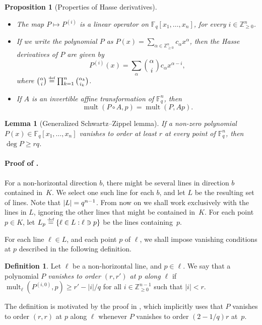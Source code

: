 \documentclass{daj}
\newtheorem{lemma}[theorem]{Lemma}
\newtheorem{proposition}[theorem]{Proposition}
\theoremstyle{definition}
\newtheorem{definition}[theorem]{Definition}
\newcommand*{\eqdef}{\stackrel{\mbox{\normalfont\tiny def}}{=}}   %
\newcommand*{\Znneg}{\mathbb{Z}_{\geq 0}}                          %
\newcommand*{\Fq}{\mathbb{F}_q}                                  %
\DeclarePairedDelimiter\abs{\lvert}{\rvert}                     %
\DeclareMathOperator{\mult}{mult}                              %
\begin{document}
\begin{proposition}[Properties of Hasse derivatives]\label{prop:hasse}\
\begin{itemize}
\item The map $P\mapsto P^{(i)}$ is a linear operator on $\Fq [x_1,\dotsc,x_n]$, for every $i\in \Znneg^{n}$.
\item If we write the polynomial $P$ as $P(x)=\sum_{\alpha\in\mathbb{Z}_{\geq 0}^n}c_\alpha x^\alpha$, then the Hasse derivatives of $P$ are given by
\[P^{(i)}(x)=\sum_{\alpha}\binom{\alpha}{i}c_{\alpha} x^{\alpha-i},\]
where $\binom{\alpha}{i}\eqdef\prod_{k=1}^n\binom{\alpha_k}{i_k}$.
\item If $A$ is an invertible affine transformation of $\Fq^n$, then 
\[\mult(P\circ A,p)=\mult(P,Ap).\]
\end{itemize}
\end{proposition}
\begin{lemma}[Generalized Schwartz--Zippel lemma]\label{lemma:SZ}
If a non-zero polynomial $P(x)\in\Fq [x_1,\dotsc,x_n]$ vanishes to order at least $r$ at every point of $\Fq^n$,
then $\deg P\geq rq$.
\end{lemma}

\paragraph{Proof of \texorpdfstring{}{Theorem 1'}.}
For a non-horizontal direction $b$, there might be several lines in direction $b$ contained in~$K$. We select one such
line for each $b$, and let $L$ be the resulting set of lines. Note that $\abs{L}=q^{n-1}$.
From now on we shall work exclusively with the lines in $L$, ignoring the other lines that might be contained in~$K$.
For each point $p\in K$, let $L_p\eqdef \{\ell \in L : \ell \ni p\}$ be the lines containing~$p$.

For each line $\ell\in L$, and each point $p$ of $\ell$, we shall
impose vanishing conditions at $p$ described in the following definition.

\begin{definition}
Let $\ell$ be a non-horizontal line, and $p\in \ell$.
We say that a polynomial \emph{$P$ vanishes to order $(r,r')$ at $p$ along $\ell$} if $\mult_{\ell}(P^{(i,0)},p)\geq r'-|i|/q$ for all $i\in\Znneg^{n-1}$ such that $|i|< r$.
\end{definition}
The definition is motivated by the proof in \cite{dkss}, which implicitly uses that $P$ vanishes to order
$(r,r)$ at $p$ along $\ell$ whenever $P$ vanishes to order $(2-1/q)r$ at~$p$.
\end{document}
